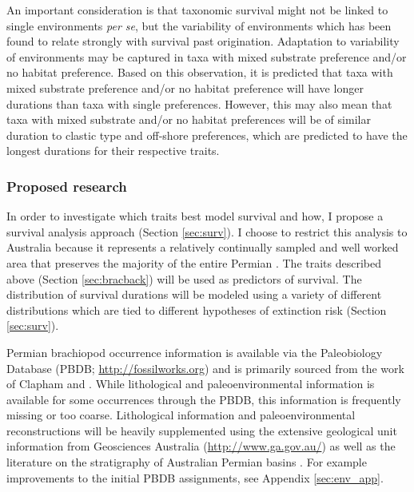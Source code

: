\documentclass[12pt,letterpaper]{article}
\begin{document}
An important consideration is that taxonomic survival might not be linked to single environments \textit{per se}, but the variability of environments \citep{Foote2013,Heim2011,Liow2007b} which has been found to relate strongly with survival past origination. Adaptation to variability of environments may be captured in taxa with mixed substrate preference and/or no habitat preference. Based on this observation, it is predicted that taxa with mixed substrate preference and/or no habitat preference will have longer durations than taxa with single preferences. However, this may also mean that taxa with mixed substrate and/or no habitat preferences will be of similar duration to clastic type and off-shore preferences, which are predicted to have the longest durations for their respective traits.


\subsubsection{Proposed research} \label{sec:bracsurvmeth}
In order to investigate which traits best model survival and how, I propose a survival analysis approach (Section \ref{sec:surv}). I choose to restrict this analysis to Australia because it represents a relatively continually sampled and well worked area that preserves the majority of the entire Permian \citep{Fielding2008,Birgenheier2010,Clapham2012,Clapham2008a,Waterhouse1987,Archbold1995}. The traits described above (Section \ref{sec:bracback}) will be used as predictors of survival. The distribution of survival durations will be modeled using a variety of different distributions which are tied to different hypotheses of extinction risk (Section \ref{sec:surv}).

Permian brachiopod occurrence information is available via the Paleobiology Database (PBDB; \url{http://fossilworks.org}) and is primarily sourced from the work of Clapham \citep{Clapham2006,Clapham2008a,Clapham2007a,Clapham2012,Clapham2007} and \citet{Waterhouse1987}. While lithological and paleoenvironmental information is available for some occurrences through the PBDB, this information is frequently missing or too coarse. Lithological information and paleoenvironmental reconstructions will be heavily supplemented using the extensive geological unit information from Geosciences Australia (\url{http://www.ga.gov.au/}) as well as the literature on the stratigraphy of Australian Permian basins \citep{Fielding2008a,Fielding2008,Fielding2006,Fielding2010,Birgenheier2010,Waterhouse1987,Waterhouse2013,Frank2008,Jones2006,Percival2012}. For example improvements to the initial PBDB assignments, see Appendix \ref{sec:env_app}.
\end{document}

